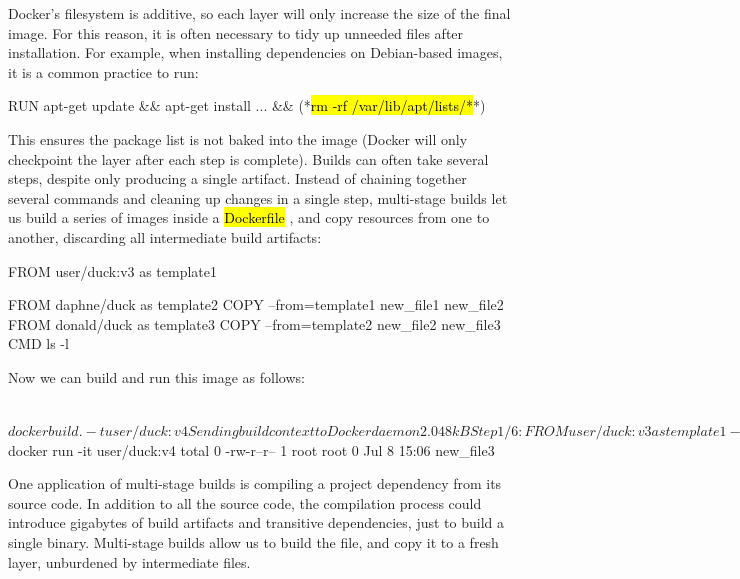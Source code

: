 \documentclass[12pt,initial,twoside,maitrise]{dms}
\newcommand{\inline}[1]{%
\begingroup%
\sethlcolor{slightgray}%
\hl{\ttfamily\small #1}%
\endgroup
}
\numberwithin{equation}{section}
\numberwithin{table}{chapter}
\numberwithin{figure}{chapter}
\begin{document}
Docker's filesystem is additive, so each layer will only increase the size of the final image. For this reason, it is often necessary to tidy up unneeded files after installation. For example, when installing dependencies on Debian-based images, it is a common practice to run:

\begin{dockerlisting}
RUN apt-get update && apt-get install ... && (*\hl{rm -rf /var/lib/apt/lists/*}*)
\end{dockerlisting}
%
This ensures the package list is not baked into the image (Docker will only checkpoint the layer after each step is complete). Builds can often take several steps, despite only producing a single artifact. Instead of chaining together several commands and cleaning up changes in a single step, multi-stage builds let us build a series of images inside a \inline{Dockerfile}, and copy resources from one to another, discarding all intermediate build artifacts:

\begin{dockerlisting}
FROM user/duck:v3 as template1

FROM daphne/duck as template2
COPY --from=template1 new_file1 new_file2
FROM donald/duck as template3
COPY --from=template2 new_file2 new_file3
CMD ls -l
\end{dockerlisting}
%
Now we can build and run this image as follows:

\begin{pclisting}
~$ docker build . -t user/duck:v4
Sending build context to Docker daemon  2.048kB
Step 1/6 : FROM user/duck:v3 as template1
--- e3b75ef8ecc4
Step 2/6 : FROM daphne/duck as template2
--- ea2f90g8de9e
Step 3/6 : COPY --from=template1 new_file1 new_file2
---> 72b96668378e
Step 4/6 : FROM donald/duck:v3 as template3
---> e3b75ef8ecc4
Step 5/6 : COPY --from=template2 new_file2 new_file3
---> cb1b84277228
Step 6/6 : CMD ls
---> Running in cb1b84277228
Removing intermediate container cb1b84277228
---> c7dc5dd63e77
Successfully built c7dc5dd63e77
Successfully tagged user/duck:v4
~$ docker run -it user/duck:v4
total 0
-rw-r--r-- 1 root root 0 Jul  8 15:06 new_file3
\end{pclisting}
%
One application of multi-stage builds is compiling a project dependency from its source code. In addition to all the source code, the compilation process could introduce gigabytes of build artifacts and transitive dependencies, just to build a single binary. Multi-stage builds allow us to build the file, and copy it to a fresh layer, unburdened by intermediate files.
\end{document}
